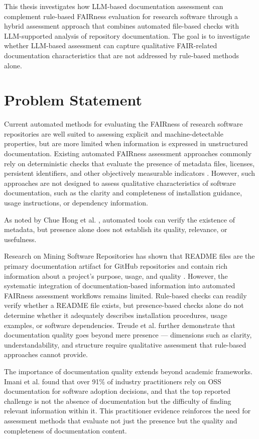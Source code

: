 This thesis investigates how LLM-based documentation assessment can
complement rule-based FAIRness evaluation for research software
through a hybrid assessment approach that combines automated
file-based checks with LLM-supported analysis of repository
documentation. The goal is to investigate whether LLM-based assessment
can capture qualitative FAIR-related documentation characteristics
that are not addressed by rule-based methods alone.

\section{Problem Statement}

Current automated methods for evaluating the FAIRness of research
software repositories are well suited to assessing explicit and
machine-detectable properties, but are more limited when information
is expressed in unstructured documentation. Existing automated
FAIRness assessment approaches commonly rely on deterministic checks
that evaluate the presence of metadata files, licenses, persistent
identifiers, and other objectively measurable indicators
\cite{fuji2021}. However, such approaches are not designed to assess
qualitative characteristics of software documentation, such as the
clarity and completeness of installation guidance, usage
instructions, or dependency information.

As noted by Chue Hong et al. \cite{chuehong2025frsm}, automated tools
can verify the existence of metadata, but presence alone does not
establish its quality, relevance, or usefulness.

Research on Mining Software Repositories has shown that README files 
are the primary documentation artifact for GitHub repositories and 
contain rich information about a project's purpose, usage, and 
quality \cite{prana2019readme}. However, the systematic integration of documentation-based information into automated FAIRness assessment workflows remains limited. 
Rule-based checks can readily verify whether a README file exists, but
presence-based checks alone do not determine whether it adequately
describes installation procedures, usage examples, or software
dependencies. Treude et al. 
\cite{treude2020beyond} further demonstrate that documentation 
quality goes beyond mere presence — dimensions such as clarity, 
understandability, and structure require qualitative assessment that 
rule-based approaches cannot provide.

The importance of documentation quality extends beyond academic 
frameworks. Imani et al. \cite{imani2024documentation} found that 
over 91\% of industry practitioners rely on OSS documentation for 
software adoption decisions, and that the top reported challenge is 
not the absence of documentation but the difficulty of finding 
relevant information within it. This practitioner evidence reinforces 
the need for assessment methods that evaluate not just the presence 
but the quality and completeness of documentation content.

